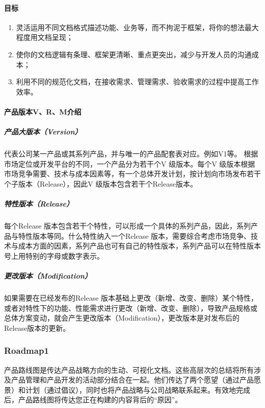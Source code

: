\documentclass[letterpaper,11pt,english]{sphinxmanual}
\begin{document}
\paragraph{目标}
\label{\detokenize{chapter_project/product_document:id3}}\begin{enumerate}
%
\item {} 
灵活运用不同文档格式描述功能、业务等，而不拘泥于框架，将你的想法最大程度用文档呈现；

\item {} 
使你的文档逻辑有条理、框架更清晰、重点更突出，减少与开发人员的沟通成本；

\item {} 
利用不同的规范化文档，在接收需求、管理需求、验收需求的过程中提高工作效率。

\end{enumerate}


\paragraph{产品版本V、R、M介绍}
\label{\detokenize{chapter_project/product_document:vrm}}

\subparagraph{产品大版本（Version）}
\label{\detokenize{chapter_project/product_document:version}}
代表公司某一产品或其系列产品，并与唯一的产品配套表对应。例如V1等。
根据市场定位或开发平台的不同，一个产品分为若干个V 级版本。每个V
级版本根据市场竞争需要、技术与成本因素等，有一个总体开发计划，按计划向市场发布若干个子版本（Release），因此V
级版本包含若干个Release版本。


\subparagraph{特性版本（Release）}
\label{\detokenize{chapter_project/product_document:release}}
每个Release
版本包含若干个特性，可以形成一个具体的系列产品，因此，系列产品与特性版本等同。什么特性纳入一个Release
版本，需要综合考虑市场竞争、技术与成本方面的因素，系列产品也可有自己的特性版本，系列产品可以在特性版本号上用特别的字母或数字表示。


\subparagraph{更改版本（Modification）}
\label{\detokenize{chapter_project/product_document:modification}}
如果需要在已经发布的Release
版本基础上更改（新增、改变、删除）某个特性，或者对特性下的功能、性能需求进行更改（新增、改变、删除），导致产品规格或总体方案变动，就会产生更改版本（Modification），更改版本是对发布后的Release版本的更新。


\subsubsection{Roadmap1\sphinxfootnotemark[734]}
\label{\detokenize{chapter_project/Roadmap:roadmap1}}\label{\detokenize{chapter_project/Roadmap::doc}}%
\begin{footnotetext}[734]\sphinxAtStartFootnote
{}
%
\end{footnotetext}\ignorespaces 
产品路线图是传达产品战略方向的生动、可视化文档。这些高层次的总结将所有涉及产品管理和产品开发的活动部分结合在一起。他们传达了两个愿望（通过产品愿景）和计划（通过倡议），同时也将产品战略与公司战略联系起来。有效地完成后，产品路线图将传达您正在构建的内容背后的“原因”。
\end{document}
